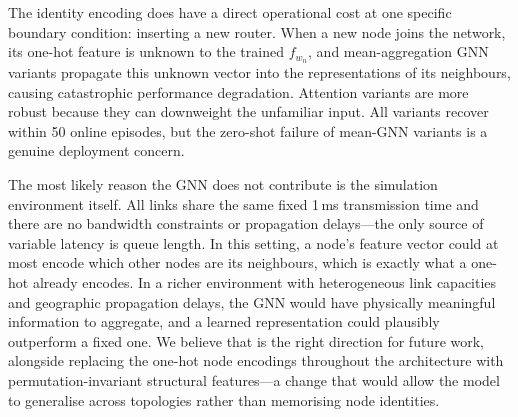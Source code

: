 \documentclass[10pt,twocolumn,letterpaper]{article}
\begin{document}
The identity encoding does have a direct operational cost at one
specific boundary condition: inserting a new router. When a new node
joins the network, its one-hot feature is unknown to the trained
$f_{w_n}$, and mean-aggregation GNN variants propagate this unknown
vector into the representations of its neighbours, causing catastrophic
performance degradation. Attention variants are more robust because they
can downweight the unfamiliar input. All variants recover within 50
online episodes, but the zero-shot failure of mean-GNN variants is a
genuine deployment concern.

The most likely reason the GNN does not contribute is the simulation
environment itself. All links share the same fixed 1\,ms transmission
time and there are no bandwidth constraints or propagation delays---the
only source of variable latency is queue length. In this setting, a
node's feature vector could at most encode which other nodes are its
neighbours, which is exactly what a one-hot already encodes. In a
richer environment with heterogeneous link capacities and geographic
propagation delays, the GNN would have physically meaningful
information to aggregate, and a learned representation could plausibly
outperform a fixed one. We believe that is the right direction for
future work, alongside replacing the one-hot node encodings throughout
the architecture with permutation-invariant structural features---a
change that would allow the model to generalise across topologies rather
than memorising node identities.
\end{document}
